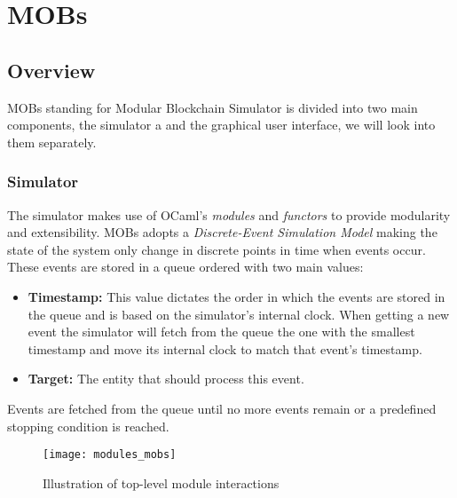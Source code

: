 
%

\chapter{MOBs}\label{cha:mobs}

\section{Overview}\label{sub:overview}

MOBs standing for Modular Blockchain Simulator is divided into two main components,
the simulator a and the graphical user interface, we will look into them separately.

\subsection{Simulator}\label{subsec:simulator}

The simulator makes use of OCaml's \textit{modules} and \textit{functors} to
provide modularity and extensibility. MOBs adopts a \textit{Discrete-Event Simulation Model}
making the state of the system only change in discrete points in time when events occur.
These events are stored in a queue ordered with two main values:
\begin{itemize}
  \item \textbf{Timestamp:} This value dictates the order in which the events are
stored in the queue and is based on the simulator's internal clock. When getting
a new event the simulator will fetch from the queue the one with the smallest timestamp
and move its internal clock to match that event's timestamp.
  \item \textbf{Target:} The entity that should process this event.
\end{itemize}
Events are fetched from the queue until no more events remain or a predefined
stopping condition is reached.

\begin{figure}[h]
	\centering
	\texttt{[image: modules\_mobs]}
	\caption{Illustration of top-level module interactions}
	\label{fig:modules_mobs}
\end{figure}


